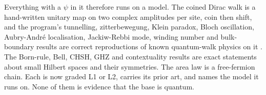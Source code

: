 Everything with a $\psi$ in it therefore runs on a model. The coined Dirac walk is a hand-written unitary map on
two complex amplitudes per site, coin then shift, and the program's tunnelling, zitterbewegung, Klein paradox,
Bloch oscillation, Aubry-Andr\'e localisation, Jackiw-Rebbi mode, winding number and bulk-boundary results are
correct reproductions of known quantum-walk physics on it \cite{strauch2006, kurzynski2008, regensburger2011,
kitagawa2010, asboth2013}. The Born-rule, Bell, CHSH, GHZ and contextuality results are exact statements about small
Hilbert spaces and their symmetries. The area law is a free-fermion chain. Each is now graded L1 or L2, carries its
prior art, and names the model it runs on. None of them is evidence that the base is quantum.
